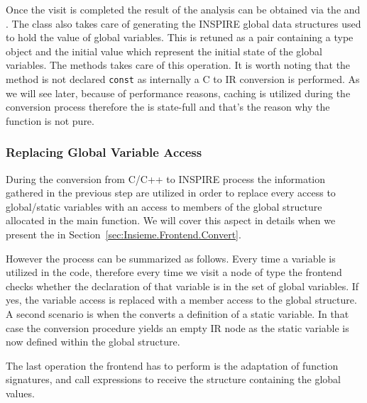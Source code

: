 Once the visit is completed the result of the analysis can be obtained via the
 and
. The
class also takes care of generating the INSPIRE global data structures used to
hold the value of global variables. This is retuned as a pair containing a type
object and the initial value which represent the initial state of the global
variables. The methods  takes care of this operation. It is
worth noting that the method is not declared {\tt const} as internally a C to IR
conversion is performed. As we will see later, because of performance reasons,
caching is utilized during the conversion process therefore the
 is state-full and that's the reason why the
 function is not pure. 

\subsubsection{Replacing Global Variable Access}

During the conversion from C/C++ to INSPIRE process the information gathered in
the previous step are utilized in order to replace every access to global/static
variables with an access to members of the global structure allocated in the
main function. We will cover this aspect in details when we present the
 in Section~\ref{sec:Insieme.Frontend.Convert}. 

However the process can be summarized as follows. Every time a variable is
utilized in the code, therefore every time we visit a node of type
 the frontend checks whether the declaration of that
variable is in the set of global variables. If yes, the variable access is
replaced with a member access to the global structure. A second scenario is when
the  converts a definition of a static variable. In that
case the conversion procedure yields an empty IR node as the static variable is
now defined within the global structure. 

The last operation the frontend has to perform is the adaptation of function
signatures, and call expressions to receive the structure containing the global
values. 

